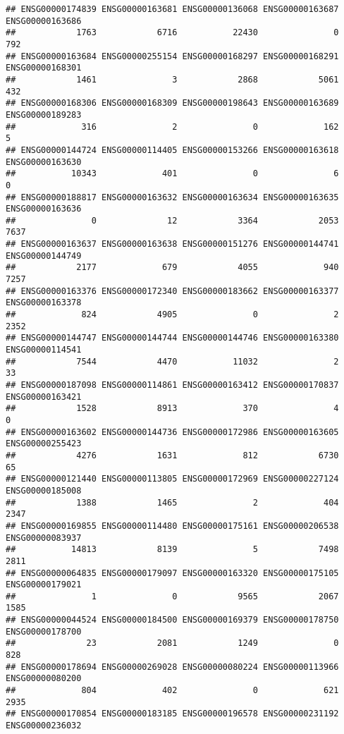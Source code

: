 \documentclass[
]{article}
\begin{document}
\begin{verbatim}
## ENSG00000174839 ENSG00000163681 ENSG00000136068 ENSG00000163687 ENSG00000163686 
##            1763            6716           22430               0             792 
## ENSG00000163684 ENSG00000255154 ENSG00000168297 ENSG00000168291 ENSG00000168301 
##            1461               3            2868            5061             432 
## ENSG00000168306 ENSG00000168309 ENSG00000198643 ENSG00000163689 ENSG00000189283 
##             316               2               0             162               5 
## ENSG00000144724 ENSG00000114405 ENSG00000153266 ENSG00000163618 ENSG00000163630 
##           10343             401               0               6               0 
## ENSG00000188817 ENSG00000163632 ENSG00000163634 ENSG00000163635 ENSG00000163636 
##               0              12            3364            2053            7637 
## ENSG00000163637 ENSG00000163638 ENSG00000151276 ENSG00000144741 ENSG00000144749 
##            2177             679            4055             940            7257 
## ENSG00000163376 ENSG00000172340 ENSG00000183662 ENSG00000163377 ENSG00000163378 
##             824            4905               0               2            2352 
## ENSG00000144747 ENSG00000144744 ENSG00000144746 ENSG00000163380 ENSG00000114541 
##            7544            4470           11032               2              33 
## ENSG00000187098 ENSG00000114861 ENSG00000163412 ENSG00000170837 ENSG00000163421 
##            1528            8913             370               4               0 
## ENSG00000163602 ENSG00000144736 ENSG00000172986 ENSG00000163605 ENSG00000255423 
##            4276            1631             812            6730              65 
## ENSG00000121440 ENSG00000113805 ENSG00000172969 ENSG00000227124 ENSG00000185008 
##            1388            1465               2             404            2347 
## ENSG00000169855 ENSG00000114480 ENSG00000175161 ENSG00000206538 ENSG00000083937 
##           14813            8139               5            7498            2811 
## ENSG00000064835 ENSG00000179097 ENSG00000163320 ENSG00000175105 ENSG00000179021 
##               1               0            9565            2067            1585 
## ENSG00000044524 ENSG00000184500 ENSG00000169379 ENSG00000178750 ENSG00000178700 
##              23            2081            1249               0             828 
## ENSG00000178694 ENSG00000269028 ENSG00000080224 ENSG00000113966 ENSG00000080200 
##             804             402               0             621            2935 
## ENSG00000170854 ENSG00000183185 ENSG00000196578 ENSG00000231192 ENSG00000236032 

\end{verbatim}
\end{document}
